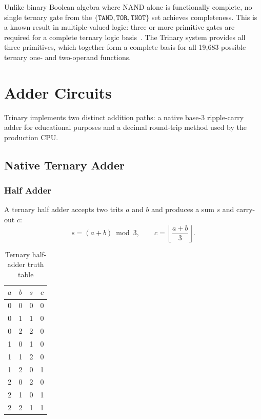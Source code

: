 \documentclass[10pt,a4paper,twoside]{book}
\begin{document}
Unlike binary Boolean algebra where NAND alone is functionally complete,
no single ternary gate from the $\{\texttt{TAND}, \texttt{TOR}, \texttt{TNOT}\}$
set achieves completeness. This is a known result in multiple-valued logic:
three or more primitive gates are required for a complete ternary logic
basis~\cite{epstein1985mvl}. The Trinary system provides all three primitives,
which together form a complete basis for all 19,683 possible ternary
one- and two-operand functions.

\chapter{Adder Circuits}
\label{ch:adder}

Trinary implements two distinct addition paths: a native base-3 ripple-carry adder
for educational purposes and a decimal round-trip method used by the production CPU.

\section{Native Ternary Adder}

\subsection{Half Adder}

A ternary half adder accepts two trits $a$ and $b$ and produces a sum $s$ and
carry-out $c$:
\[
s = (a + b) \bmod 3,\qquad c = \left\lfloor\frac{a + b}{3}\right\rfloor.
\]

\begin{table}[H]
\centering
\caption{Ternary half-adder truth table}
\label{tab:halfadder}
\begin{tabular}{cc|c|c}
$a$ & $b$ & $s$ & $c$ \\ \midrule
0 & 0 & 0 & 0 \\
0 & 1 & 1 & 0 \\
0 & 2 & 2 & 0 \\
1 & 0 & 1 & 0 \\
1 & 1 & 2 & 0 \\
1 & 2 & 0 & 1 \\
2 & 0 & 2 & 0 \\
2 & 1 & 0 & 1 \\
2 & 2 & 1 & 1 \\
\bottomrule
\end{tabular}
\end{table}
\end{document}
